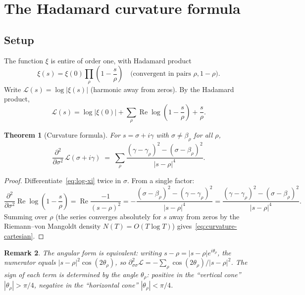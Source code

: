 \documentclass[11pt]{amsart}
\newtheorem{theorem}{Theorem}[section]
\newtheorem{remark}[theorem]{Remark}
\renewcommand{\Re}{\operatorname{Re}}
\begin{document}
\section{The Hadamard curvature formula}
\label{sec:curvature}

\subsection{Setup}

The function $\xi$ is entire of order one, with Hadamard product
\begin{equation}\label{eq:hadamard}
  \xi(s) = \xi(0)\prod_\rho\!\left(1-\frac{s}{\rho}\right)
  \quad\text{(convergent in pairs $\rho,1-\rho$)}.
\end{equation}
Write $\mathcal{L}(s) = \log|\xi(s)|$ (harmonic away from zeros).
By the Hadamard product,
\begin{equation}\label{eq:log-xi}
  \mathcal{L}(s) = \log|\xi(0)| + \sum_\rho \Re\log\!\left(1-\frac{s}{\rho}\right)+\frac{s}{\rho}.
\end{equation}

\begin{theorem}[Curvature formula]\label{thm:curvature}
For $s = \sigma + i\gamma$ with $\sigma \neq \beta_\rho$ for all $\rho$,
\begin{equation}\label{eq:curvature-cartesian}
  \frac{\partial^2}{\partial\sigma^2}\,\mathcal{L}(\sigma+i\gamma)
  \;=\;
  \sum_\rho \frac{(\gamma-\gamma_\rho)^2 - (\sigma-\beta_\rho)^2}{|s-\rho|^4}.
\end{equation}
\end{theorem}

\begin{proof}
Differentiate~\eqref{eq:log-xi} twice in $\sigma$.  From a single factor:
\[
  \frac{\partial^2}{\partial\sigma^2}\Re\log\!\left(1-\frac{s}{\rho}\right)
  = \Re\frac{-1}{(s-\rho)^2}
  = -\frac{(\sigma-\beta_\rho)^2-(\gamma-\gamma_\rho)^2}{|s-\rho|^4}
  = \frac{(\gamma-\gamma_\rho)^2-(\sigma-\beta_\rho)^2}{|s-\rho|^4}.
\]
Summing over $\rho$ (the series converges absolutely for $s$ away from zeros
by the Riemann--von Mangoldt density $N(T) = O(T\log T)$) gives~\eqref{eq:curvature-cartesian}.
\end{proof}

\begin{remark}
The angular form is equivalent: writing $s - \rho = |s-\rho|e^{i\theta_\rho}$,
the numerator equals $|s-\rho|^2 \cos(2\theta_\rho)$, so
$\partial^2_{\sigma\sigma}\mathcal{L} = -\sum_\rho \cos(2\theta_\rho)/|s-\rho|^2$.
The sign of each term is determined by the angle $\theta_\rho$: positive in the
``vertical cone'' $|\theta_\rho| > \pi/4$, negative in the ``horizontal cone''
$|\theta_\rho| < \pi/4$.
\end{remark}
\end{document}
